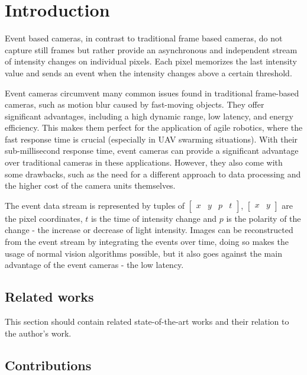 
\chapter{Introduction\label{chap:introduction}}

Event based cameras, in contrast to traditional frame based cameras, do not capture still frames but rather
provide an asynchronous and independent stream of intensity changes on individual pixels.
Each pixel memorizes the last intensity value and sends an event when the intensity changes above a certain threshold.

Event cameras circumvent many common issues found in traditional frame-based cameras, such as motion blur caused
by fast-moving objects. They offer significant advantages, including a high dynamic range, low latency,
and energy efficiency.
This makes them perfect for the application of agile robotics,
where the fast response time is crucial (especially in UAV swarming situations). With their sub-millisecond response time,
event cameras can provide a significant advantage over traditional cameras in these applications.
However, they also come with some drawbacks, such as the need for a different approach to
data processing and the higher cost of the camera units themselves. \cite{gallego22event}


The event data stream is represented by tuples of $\begin{bmatrix} x & y & p & t \end{bmatrix}$, $\begin{bmatrix} x & y \end{bmatrix}$ are the pixel coordinates, $t$ is the time of
intensity change and $p$ is the polarity of the change - the increase or decrease of light intensity. Images can be
reconstructed from the event stream by integrating the events over time, doing so makes the usage of normal vision 
algorithms possible, but it also goes against the main advantage of the event cameras - the low latency.

\section{Related works}

This section should contain related state-of-the-art works and their relation to the author's work.

\section{Contributions}

